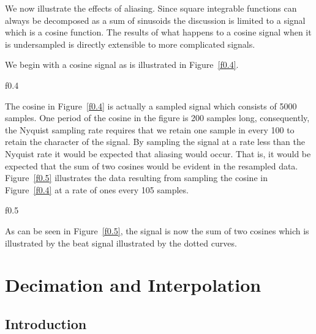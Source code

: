 	We now illustrate the effects of aliasing.
Since square integrable functions can always be decomposed as a sum
of sinusoids the discussion is limited to a signal which is 
a cosine function.  The results of  what happens to a cosine signal
when it is undersampled is directly extensible to more complicated 
signals.

	We begin with a cosine signal as is illustrated in 
Figure~\ref{f0.4}.
%

{f0.4}

%
The cosine in Figure~\ref{f0.4} is actually a sampled signal which
consists of 5000 samples.  One period of the cosine in the figure
is 200 samples long, consequently, the Nyquist sampling rate requires
that we retain one sample in every 100 to retain the character of the
signal.  By sampling the signal at a rate less than the Nyquist rate
it would be expected that aliasing would occur.  That is, it would
be expected that the sum of two cosines would be evident in the 
resampled data.  Figure~\ref{f0.5} illustrates the data resulting
from sampling the cosine in Figure~\ref{f0.4} at a rate of ones every
105 samples.
%

{f0.5}

%
As can be seen in Figure~\ref{f0.5}, the signal is now the sum
of two cosines which is illustrated by the beat signal illustrated
by the dotted curves.

\section{Decimation and Interpolation}

\subsection{Introduction}


